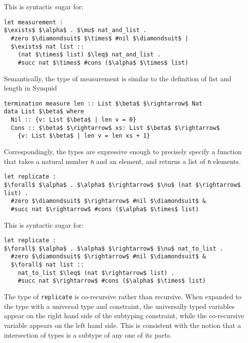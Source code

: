 \documentclass[sigplan,screen]{acmart}
\begin{document}
\hfill

\noindent This is syntactic sugar for:

\begin{lstlisting}[]
let measurement : 
$\exists$ $\alpha$ . $\mu$ nat_and_list .
  #zero $\diamondsuit$ $\times$ #nil $\diamondsuit$ | 
  $\exists$ nat list :: 
    (nat $\times$ list) $\leq$ nat_and_list .
    #succ nat $\times$ #cons ($\alpha$ $\times$ list)
\end{lstlisting}

\hfill

\noindent Semantically, the type of measurement is similar to the definition of 
list and length in Synquid \cite{}    

\begin{lstlisting}[keywords={termination, measure, data, where}]
termination measure len :: List $\beta$ $\rightarrow$ Nat 
data List $\beta$ where
  Nil :: {v: List $\beta$ | len v = 0}
  Cons :: $\beta$ $\rightarrow$ xs: List $\beta$ $\rightarrow$ 
    {v: List $\beta$ | len v = len xs + 1}

\end{lstlisting}

\hfill

\noindent Correspondingly, the types are expressive enough to precisely specify
a function that takes a natural number \lstinline{n} 
and an element, and returns a list of \lstinline{n} elements.

\begin{lstlisting}[]
let replicate : 
$\forall$ $\alpha$ . $\alpha$ $\rightarrow$ $\nu$ (nat $\rightarrow$ list) .
  #zero $\diamondsuit$ $\rightarrow$ #nil $\diamondsuit$ & 
  #succ nat $\rightarrow$ #cons ($\alpha$ $\times$ list)
\end{lstlisting}



\hfill

\noindent This is syntactic sugar for:

\begin{lstlisting}[]
let replicate : 
$\forall$ $\alpha$ . $\alpha$ $\rightarrow$ $\nu$ nat_to_list .
  #zero $\diamondsuit$ $\rightarrow$ #nil $\diamondsuit$ & 
  $\forall$ nat list :: 
    nat_to_list $\leq$ (nat $\rightarrow$ list) .
    #succ nat $\rightarrow$ #cons ($\alpha$ $\times$ list)
\end{lstlisting}

\hfill

\noindent The type of \lstinline{replicate} is co-recursive rather than recursive. 
When expanded to the type with a universal type and constraint, 
the universally typed variables appear on the right hand side 
of the subtyping constraint, while the co-recursive variable
appears on the left hand side. This is consistent with the notion
that a intersection of types is a subtype of any one of its parts.
\end{document}
